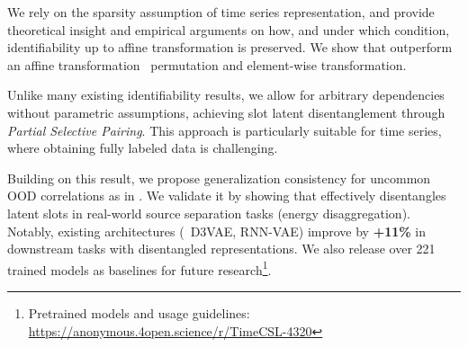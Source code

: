 \documentclass{article} %
\theoremstyle{plain}
\theoremstyle{definition}
\theoremstyle{remark}
\numberwithin{equation}{section}
\begin{document}
\begin{enumerate}[label={[{\color{gray!100}\arabic*}]}, leftmargin=*]
    \item We rely on the sparsity assumption of time series representation, and provide theoretical insight and empirical arguments on how, and under which condition, identifiability up to affine transformation  is preserved. We show that \TimeCSL outperform an affine transformation \eg~permutation and element-wise transformation.
    \item Unlike many existing identifiability results, we allow for arbitrary dependencies without parametric assumptions, achieving slot latent disentanglement through \emph{Partial Selective Pairing}. This approach is particularly suitable for time series, where obtaining fully labeled data is challenging.
    \item Building on this result, we propose generalization consistency for uncommon OOD correlations as in . We validate it by showing that \TimeCSL effectively disentangles latent slots in real-world source separation tasks (\eg energy disaggregation). Notably, existing architectures (\eg~D3VAE, RNN-VAE) improve by {\bf +11\%} \RMSE in downstream tasks with disentangled representations. We also release over 221 trained models as baselines for future research\footnote{Pretrained models and usage guidelines: \url{https://anonymous.4open.science/r/TimeCSL-4320}}.
    \vspace{-0.3cm}

\end{enumerate}
\end{document}
